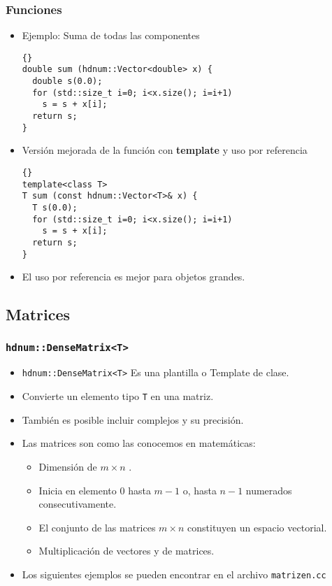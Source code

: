 \begin{frame}[fragile]
\frametitle{Funciones}
\begin{itemize}
\item Ejemplo: Suma de todas las componentes \\
{\footnotesize{\begin{lstlisting}{}
double sum (hdnum::Vector<double> x) {
  double s(0.0);
  for (std::size_t i=0; i<x.size(); i=i+1)
    s = s + x[i];
  return s;
}
\end{lstlisting}}}
\item Versión mejorada de la función con \textbf{template} y uso por referencia\\
{\footnotesize{\begin{lstlisting}{}
template<class T>
T sum (const hdnum::Vector<T>& x) {
  T s(0.0);
  for (std::size_t i=0; i<x.size(); i=i+1)
    s = s + x[i];
  return s;
}
\end{lstlisting}}}
\item El uso por referencia es mejor para objetos grandes.
\end{itemize}
\end{frame}

\subsection{Matrices}

\begin{frame}[fragile]
\frametitle{\lstinline{hdnum::DenseMatrix<T>}}
\begin{itemize}
\item \lstinline{hdnum::DenseMatrix<T>} Es una plantilla o Template de clase.
\item Convierte un elemento tipo \lstinline{T} en una matriz.
\item También es posible incluir complejos y su precisión.
\item Las matrices son como las conocemos en matemáticas:
\begin{itemize}
\item Dimensión de $m\times n$ .
\item Inicia en elemento $0$ hasta $m-1$ o, hasta $n-1$ numerados consecutivamente.
\item El conjunto de las matrices $m\times n$ constituyen un espacio vectorial.
\item Multiplicación de vectores y de matrices.
\end{itemize}
\item Los siguientes ejemplos se pueden encontrar en el archivo \lstinline{matrizen.cc}
\end{itemize}
\end{frame}

